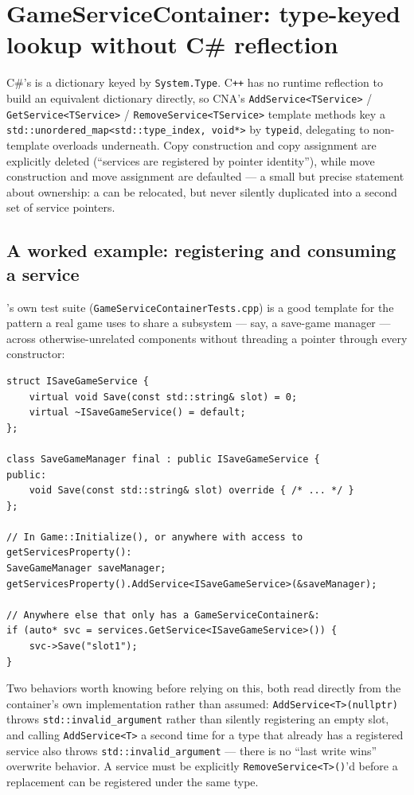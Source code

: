 \section{GameServiceContainer: type-keyed lookup without C\# reflection}

C\#'s  is a dictionary keyed by \texttt{System.Type}. C\texttt{++}
has no runtime reflection to build an equivalent dictionary directly, so CNA's
\texttt{AddService<TService>} / \texttt{GetService<TService>} / \texttt{RemoveService<TService>}
template methods key a \texttt{std::unordered\_map<std::type\_index, void*>} by
\texttt{typeid}, delegating to non-template overloads underneath. Copy construction and copy
assignment are explicitly deleted (``services are registered by pointer identity''), while
move construction and move assignment are defaulted --- a small but precise statement about
ownership: a  can be relocated, but never silently duplicated
into a second set of service pointers.

\subsection{A worked example: registering and consuming a service}

's own test suite
(\texttt{GameServiceContainerTests.cpp}) is a good template for the pattern a real game uses
to share a subsystem --- say, a save-game manager --- across otherwise-unrelated components
without threading a pointer through every constructor:

\begin{lstlisting}
struct ISaveGameService {
    virtual void Save(const std::string& slot) = 0;
    virtual ~ISaveGameService() = default;
};

class SaveGameManager final : public ISaveGameService {
public:
    void Save(const std::string& slot) override { /* ... */ }
};

// In Game::Initialize(), or anywhere with access to getServicesProperty():
SaveGameManager saveManager;
getServicesProperty().AddService<ISaveGameService>(&saveManager);

// Anywhere else that only has a GameServiceContainer&:
if (auto* svc = services.GetService<ISaveGameService>()) {
    svc->Save("slot1");
}
\end{lstlisting}

Two behaviors worth knowing before relying on this, both read directly from the container's
own implementation rather than assumed: \texttt{AddService<T>(nullptr)} throws
\texttt{std::invalid\_argument} rather than silently registering an empty slot, and calling
\texttt{AddService<T>} a second time for a type that already has a registered service also
throws \texttt{std::invalid\_argument} --- there is no ``last write wins'' overwrite behavior.
A service must be explicitly \texttt{RemoveService<T>()}'d before a replacement can be
registered under the same type.

